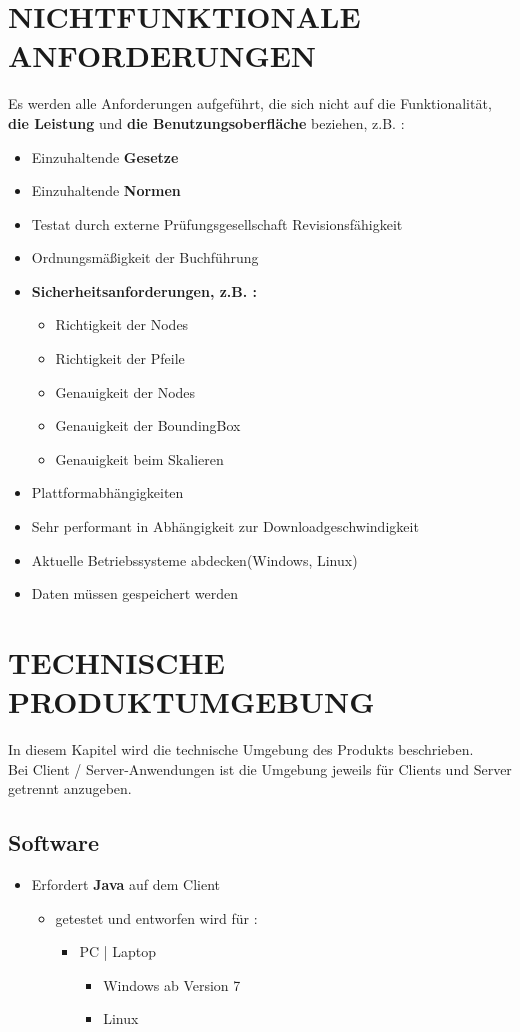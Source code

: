 	\section{\Large NICHTFUNKTIONALE ANFORDERUNGEN}
	Es werden alle Anforderungen aufgeführt, die sich nicht auf die Funktionalität, \textbf{ die Leistung} und \textbf{ die Benutzungsoberfläche} beziehen, z.B. :
	\begin{itemize}
		\item Einzuhaltende \textbf{Gesetze}
		\item Einzuhaltende \textbf{Normen}
		\item Testat durch externe Prüfungsgesellschaft
		Revisionsfähigkeit 
		\item Ordnungsmäßigkeit der Buchführung
		\item \textbf{ Sicherheitsanforderungen, z.B. :}
		\begin{itemize}
			\item Richtigkeit der Nodes
			\item Richtigkeit der Pfeile
			\item Genauigkeit der Nodes
			\item Genauigkeit der BoundingBox
			\item Genauigkeit beim Skalieren
		\end{itemize}  
		\item Plattformabhängigkeiten
		\item Sehr performant in Abhängigkeit zur Downloadgeschwindigkeit
		\item Aktuelle Betriebssysteme abdecken(Windows, Linux)
		\item Daten müssen gespeichert werden	 
	\end{itemize} 

	
	\section{\Large TECHNISCHE PRODUKTUMGEBUNG}
   	In diesem Kapitel wird die technische Umgebung des Produkts beschrieben.\\
   	Bei Client / Server-Anwendungen ist die Umgebung jeweils für Clients und Server getrennt anzugeben.
	\subsection{Software}
	\begin{itemize}
		\item Erfordert \textbf{Java} auf dem Client
		\begin{itemize}
			\item getestet und entworfen wird für :
			\begin{itemize}
				\item PC | Laptop
				\begin{itemize}
					\item Windows ab Version 7
					\item Linux
				\end{itemize}
			\end{itemize}
		\end{itemize}
	\end{itemize}
